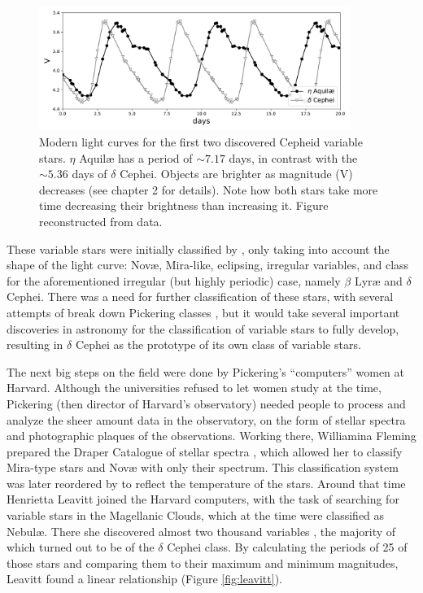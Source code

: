 \begin{figure}[H] 
	\centering
	\includegraphics[width=0.9\textwidth]{img/eta_aquilae_delta_cephei_light_curves.pdf}
	\caption{Modern light curves for the first two discovered Cepheid variable stars. 
	$\eta$ Aquil\ae{} has a period of $\sim7.17$ days, in contrast with the $\sim5.36$ days of $\delta$ Cephei.
	Objects are brighter as magnitude (V) decreases (see chapter 2 for details). 
	Note how both stars take more time decreasing their brightness than increasing it. 
	Figure reconstructed from \cite{Kiss1998} data.}
	\label{fig:first-cepheids}
\end{figure}


These variable stars were initially classified by \cite{Pickering1880}, only taking into account the shape of the light curve: 
Nov\ae{}, Mira-like, eclipsing, irregular variables, and class for the aforementioned irregular (but highly periodic) case, namely $\beta$ Lyr\ae{} and $\delta$ Cephei.
There was a need for further classification of these stars, with several attempts of break down Pickering classes \citep{Lockyer1896,Lockyer1897}, 
but it would take several important discoveries in astronomy for the classification of variable stars to fully develop,
resulting in $\delta$ Cephei as the prototype of its own class of variable stars.


The next big steps on the field were done by Pickering's ``computers'' women at Harvard. 
Although the universities refused to let women study at the time, Pickering (then director of Harvard's observatory) needed people to process and analyze the sheer amount data in the observatory, 
on the form of stellar spectra and photographic plaques of the observations.
Working there, Williamina Fleming prepared the Draper Catalogue of stellar spectra \citep{Pickering1890}, 
which allowed her to classify Mira-type stars and Nov\ae{} with only their spectrum. 
This classification system was later reordered by \cite{Canon1901} to reflect the temperature of the stars.
Around that time Henrietta Leavitt joined the Harvard computers, 
with the task of searching for variable stars in the Magellanic Clouds, which at the time were classified as Nebul\ae{}.
There she discovered almost two thousand variables \citep{Leavitt1908}, the majority of which turned out to be of the $\delta$ Cephei class. 
By calculating the periods of 25 of those stars and comparing them to their maximum and minimum magnitudes, Leavitt found a linear relationship (Figure \ref{fig:leavitt}).

